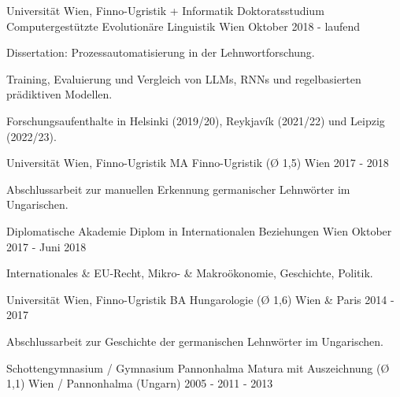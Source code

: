 

\begin{cventries}

  \cventry
    {Universität Wien, Finno-Ugristik + Informatik} %
    {Doktoratsstudium Computergestützte Evolutionäre Linguistik} %
    {Wien} %
    {Oktober 2018 - laufend} %
    {
      \begin{cvitems} %
        \item{Dissertation: Prozessautomatisierung in der Lehnwortforschung.}
        \item{Training, Evaluierung und Vergleich von LLMs, RNNs und regelbasierten prädiktiven Modellen.}
        \item{Forschungsaufenthalte in Helsinki (2019/20), Reykjavík (2021/22) und Leipzig (2022/23).}
      \end{cvitems}
    }

  \cventry
    {Universität Wien, Finno-Ugristik} %
    {MA Finno-Ugristik (Ø 1,5)} %
    {Wien} %
    {2017 - 2018} %
    {
      \begin{cvitems} %
        \item {Abschlussarbeit zur manuellen Erkennung germanischer Lehnwörter im Ungarischen.}
      \end{cvitems}
    }

  \cventry
    {Diplomatische Akademie} %
    {Diplom in Internationalen Beziehungen} %
    {Wien} %
    {Oktober 2017 - Juni 2018} %
    {
    \begin{cvitems} %
        \item{Internationales \& EU-Recht, Mikro- \& Makroökonomie, Geschichte, Politik.}
      \end{cvitems}
    }
    
  \cventry
    {Universität Wien, Finno-Ugristik} %
    {BA Hungarologie (Ø 1,6)} %
    {Wien \& Paris} %
    {2014 - 2017} %
    {
      \begin{cvitems} %
        \item {Abschlussarbeit zur Geschichte der germanischen Lehnwörter im Ungarischen.}
      \end{cvitems}
    }
        
  \cventry
    {Schottengymnasium / Gymnasium Pannonhalma} %
    {Matura mit Auszeichnung (Ø 1,1)} %
    {Wien / Pannonhalma (Ungarn)} %
    {2005 - 2011 - 2013} %
    {}
\end{cventries}
